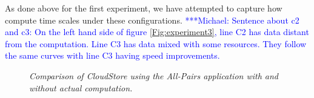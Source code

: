 \documentclass{rspublic}
\newcommand{\micnote}[1]{ {\textcolor{blue} { ***Michael: #1 }}}
\begin{document}
As done above for the first experiment, we have attempted to capture how
compute time scales under these configurations. \micnote{Sentence about
c2 and c3: On the left hand side of figure \ref{Fig:experiment3}, line
C2 has data distant from the computation. Line C3 has data mixed with
some resources. They follow the same curves with line C3 having speed
improvements.} 
\begin{center}
\begin{figure}
\caption{\textit{Comparison of CloudStore using the All-Pairs
application with and without actual computation.}}
\label{Fig:experiment4}
\end{figure}
\end{center}
\end{document}
